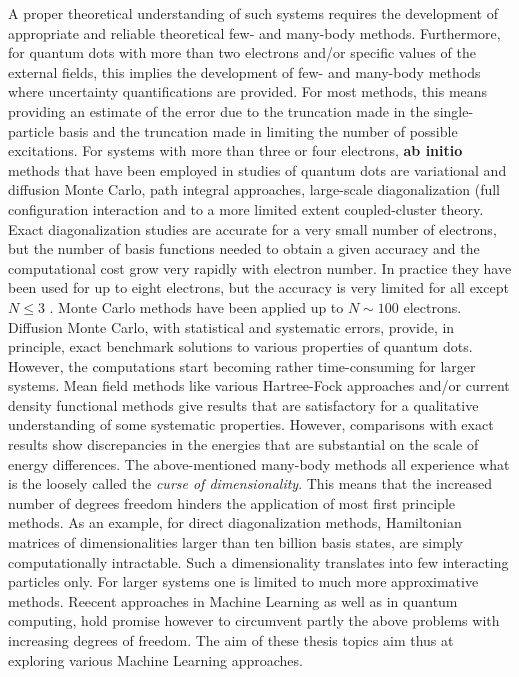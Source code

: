 \documentclass[%
oneside,                 %
final,                   %
10pt]{article}
\begin{document}
A proper theoretical understanding of such systems
requires the development of appropriate and reliable theoretical
few- and many-body methods.  Furthermore, for quantum dots with more
than two electrons and/or specific values of the external fields, this
implies the development of few- and many-body methods where
uncertainty quantifications are provided.  For most methods, this
means providing an estimate of the error due to the truncation made in
the single-particle basis and the truncation made in limiting the
number of possible excitations.  For systems with more than three or
four electrons, \textbf{ab initio} methods that have been employed in
studies of quantum dots are variational and diffusion Monte Carlo, path integral approaches, large-scale diagonalization (full configuration
interaction and to a more
limited extent coupled-cluster theory.
Exact diagonalization studies are accurate for a very small number of
electrons, but the number of basis functions needed to obtain a given
accuracy and the computational cost grow very rapidly with electron
number.  In practice they have been used for up to eight
electrons, but the accuracy is very
limited for all except $N\le 3$ .  Monte Carlo methods have been
applied up to $N\sim 100$ electrons. Diffusion Monte Carlo, with
statistical and systematic errors, provide, in principle, exact
benchmark solutions to various properties of quantum dots. However,
the computations start becoming rather time-consuming for larger
systems.  Mean field methods like various Hartree-Fock approaches and/or 
current density functional
methods give results that are
satisfactory for a qualitative understanding of some systematic
properties. However, comparisons with exact results show discrepancies
in the energies that are substantial on the scale of energy
differences. The above-mentioned many-body methods all experience what is the loosely called the \emph{curse of dimensionality}. This means that the increased number of degrees freedom hinders the application of most first principle methods. As an example, for direct diagonalization methods, Hamiltonian matrices of dimensionalities larger than ten billion basis states, are simply computationally intractable. Such a dimensionality translates into few interacting particles only. For larger systems one is limited to much more approximative methods. 
Reecent approaches in Machine Learning as well as in quantum computing, hold promise however to circumvent partly the above problems with increasing degrees of freedom. 
The aim of these thesis topics aim thus at exploring various Machine Learning approaches. 
\end{document}
